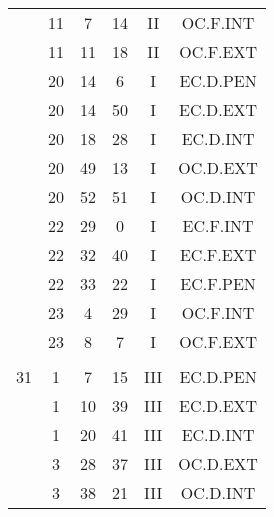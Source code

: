 \documentclass[12pt, a4paper]{article}
\begin{document}
\begin{multicols}{3}
{\begin{tabular}{c c c c c c}
	 	 	 	 & 11 & 7 & 14 & II & OC.F.INT\\%
	 	 	 	 & 11 & 11 & 18 & II & OC.F.EXT\\%
	 	 	 	 & 20 & 14 & 6 & I & EC.D.PEN\\%
	 	 	 	 & 20 & 14 & 50 & I & EC.D.EXT\\%
	 	 	 	 & 20 & 18 & 28 & I & EC.D.INT\\%
	 	 	 	 & 20 & 49 & 13 & I & OC.D.EXT\\%
	 	 	 	 & 20 & 52 & 51 & I & OC.D.INT\\%
	 	 	 	 & 22 & 29 & 0 & I & EC.F.INT\\%
	 	 	 	 & 22 & 32 & 40 & I & EC.F.EXT\\%
	 	 	 	 & 22 & 33 & 22 & I & EC.F.PEN\\%
	 	 	 	 & 23 & 4 & 29 & I & OC.F.INT\\%
	 	 	 	 & 23 & 8 & 7 & I & OC.F.EXT\\%
	 	 	 	 & & & & & \\%
	 	 	 	31 & 1 & 7 & 15 & III & EC.D.PEN\\%
	 	 	 	 & 1 & 10 & 39 & III & EC.D.EXT\\%
	 	 	 	 & 1 & 20 & 41 & III & EC.D.INT\\%
	 	 	 	 & 3 & 28 & 37 & III & OC.D.EXT\\%
	 	 	 	 & 3 & 38 & 21 & III & OC.D.INT\\%
	 	 \end{tabular}
 	}
\end{multicols}
\end{document}
